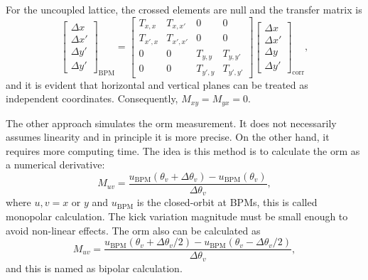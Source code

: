 For the uncoupled lattice, the crossed elements are null and the transfer matrix is
\begin{equation}
    \begin{bmatrix}
    \Delta x \\
    \Delta x' \\
    \Delta y' \\
    \Delta y'
    \end{bmatrix}_{\mathrm{BPM}}  =
    \begin{bmatrix}
    T_{x, x} & T_{x, x'} & 0 & 0  \\
    T_{x', x} & T_{x', x'} & 0 & 0 \\
    0 & 0  & T_{y, y} & T_{y, y'} \\
    0 & 0 & T_{y', y} & T_{y', y'} 
    \end{bmatrix} 
    \begin{bmatrix}
    \Delta x \\
    \Delta x' \\
    \Delta y \\
    \Delta y'
    \end{bmatrix}_{\mathrm{corr}},
\end{equation}
and it is evident that horizontal and vertical planes can be treated as independent coordinates. Consequently, $M_{xy} = M_{yx} = 0$.

The other approach simulates the \gls{orm} measurement. It does not necessarily assumes linearity and in principle it is more precise. On the other hand, it requires more computing time. The idea is this method is to calculate the \gls{orm} as a numerical derivative:
\begin{equation}
    M_{uv} = \dfrac{u_{\mathrm{BPM}}\left(\theta_v + \Delta \theta_v\right)-u_{\mathrm{BPM}}\left(\theta_v \right)}{\Delta \theta_v},
    \label{eq:unipolar_respm}
\end{equation}
where $u, v = x$ or $y$ and $u_{\mathrm{BPM}}$ is the closed-orbit at BPMs, this is called monopolar calculation. The kick variation magnitude must be small enough to avoid non-linear effects. The \gls{orm} also can be calculated as
\begin{equation}
    M_{uv} = \dfrac{u_{\mathrm{BPM}}\left(\theta_v + \Delta \theta_v/2\right)-u_{\mathrm{BPM}}\left(\theta_v- \Delta \theta_v/2\right)}{\Delta \theta_v},
    \label{eq:bipolar_respm}
\end{equation}
and this is named as bipolar calculation.


